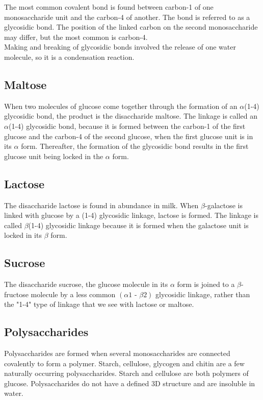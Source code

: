 \documentclass[11pt]{article}
\begin{document}
The most common covalent bond is found between carbon-1 of one monosaccharide unit and the carbon-4 of another. The bond is referred to as a glycosidic bond. The position of the linked carbon on the second monosaccharide may differ, but the most common is carbon-4.
\\[0pt]

Making and breaking of glycosidic bonds involved the release of one water molecule, so it is a condensation reaction.

\subsection{Maltose}
\label{sec:orgebc0f2f}
When two molecules of glucose come together through the formation of an \(\alpha\)(1-4) glycosidic bond, the product is the disaccharide maltose. The linkage is called an \(\alpha\)(1-4) glycosidic bond, because it is formed between the carbon-1 of the first glucose and the carbon-4 of the second glucose, when the first glucose unit is in its \(\alpha\) form. Thereafter, the formation of the glycosidic bond results in the first glucose unit being locked in the \(\alpha\) form.

\subsection{Lactose}
\label{sec:orga079286}
The disaccharide lactose is found in abundance in milk. When \(\beta\)-galactose is linked with glucose by a (1-4) glycosidic linkage, lactose is formed. The linkage is called \(\beta\)(1-4) glycosidic linkage because it is formed when the galactose unit is locked in its \(\beta\) form.

\subsection{Sucrose}
\label{sec:org9b99fe1}
The disaccharide sucrose, the glucose molecule in its \(\alpha\) form is joined to a \(\beta\)-fructose molecule by a less common \((\alpha 1 \text{ - } \beta 2)\) glycosidic linkage, rather than the "1-4" type of linkage that we see with lactose or maltose.

\subsection{Polysaccharides}
\label{sec:org0f623d8}
Polysaccharides are formed when several monosaccharides are connected covalently to form a polymer. Starch, cellulose, glycogen and chitin are a few naturally occurring polysaccharides. Starch and cellulose are both polymers of glucose. Polysaccharides do not have a defined 3D structure and are insoluble in water.
\end{document}
